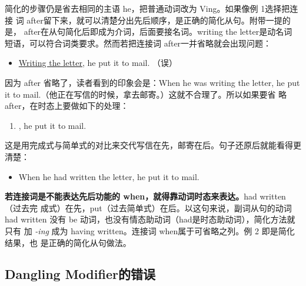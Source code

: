 简化的步骤仍是省去相同的主语 he，把普通动词改为 Ving。如果像例 1选择把连接
词 after留下来，就可以清楚分出先后顺序，是正确的简化从句。附带一提的
是， after在从句简化后即成为介词，后面要接名词。writing the letter是动名词
短语，可以符合词类要求。然而若把连接词 after一并省略就会出现问题：
\begin{itemize}
\item \ul{Writing the letter}, he put it to mail. （误）
\end{itemize}
因为 after 省略了，读者看到的印象会是：When he was writing the letter, he
put it to mail.（他正在写信的时候，拿去邮寄。）这就不合理了。所以如果要省
略 after，在时态上要做如下的处理：
\begin{enumerate}[resume]
\item {}, he put it to mail.
\end{enumerate}
这是用完成式与简单式的对比来交代写信在先，邮寄在后。句子还原后就能看得更清楚：
\begin{itemize}
\item When he had written the letter, he put it to mail.
\end{itemize}
\textbf{若连接词是不能表达先后功能的 when，就得靠动词时态来表达。}had written（过去完
成式）在先，put（过去简单式）在后。以这句来说，副词从句的动词had
written 没有 be 动词，也没有情态助动词（had是时态助动词），简化方法就只有
加 \emph{-ing} 成为 having written。连接词 when属于可省略之列。例 2 即是简化结果，也
是正确的简化从句做法。

\subsection{Dangling Modifier的错误}

